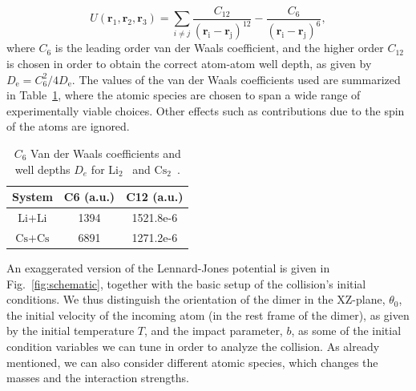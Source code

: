 \documentclass[%
 reprint,
 amsmath,amssymb,
 aps,
 nofootinbib
]{revtex4-1}
\begin{document}
\begin{equation}
U(\mathbf{r_{\mathrm{1}}}, \mathbf{r_{\mathrm{2}}}, \mathbf{r_{\mathrm{3}}}) = \sum_{i \neq j} \frac{C_{\mathrm{12}}}{(\mathbf{r_{\mathrm{i}}}-\mathbf{r_{\mathrm{j}}})^{12}} - \frac{C_{\mathrm{6}}}{(\mathbf{r_{\mathrm{i}}}-\mathbf{r_{\mathrm{j}}})^6},
\label{eq:LJ}
\end{equation}
\noindent where $C_{\mathrm{6}}$ is the leading order van der Waals coefficient, and the higher order $C_{\mathrm{12}}$ is chosen in order to obtain the correct atom-atom well depth, as given by $D_{\mathrm{e}} = C_{\mathrm{6}}^2/4D_{\mathrm{e}}$.  The values of the van der Waals coefficients used are summarized in Table~\ref{table:coeffs}, where the atomic species are chosen to span a wide range of experimentally viable choices. Other effects such as contributions due to the spin of the atoms are ignored. 

\begin{table}
\begin{center}
 \begin{tabular}{|c c c|} 
 \hline
 System & C6 (a.u.) & C12 (a.u.)\\ 
 \hline\hline
$\text{Li} + \text{Li}$ & 1394 & 1521.8e-6 \\ 
 \hline
 $\text{Cs} + \text{Cs}$ & 6891 & 1271.2e-6 \\
 \hline
\end{tabular}
\caption{$C_6$ Van der Waals coefficients and well depths $D_e$ for $\mathrm{Li_2}$~\cite{dattani2011} and $\mathrm{Cs_2}$~\cite{xie2009}.}
\label{table:coeffs}
\end{center}
\end {table}

An exaggerated version of the Lennard-Jones potential is given in Fig.~\ref{fig:schematic}, together with the basic setup of the collision's initial conditions. We thus distinguish the orientation of the dimer in the XZ-plane, $\theta_0$, the initial velocity of the incoming atom (in the rest frame of the dimer), as given by the initial temperature $T$, and the impact parameter, $b$, as some of the initial condition variables we can tune in order to analyze the collision. As already mentioned, we can also consider different atomic species, which changes the masses and the interaction strengths.
\end{document}
